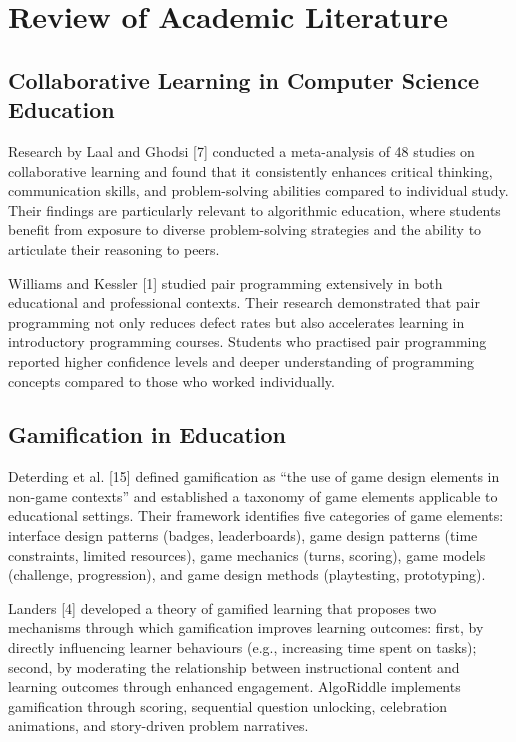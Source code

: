 \section{Review of Academic Literature}

\subsection{Collaborative Learning in Computer Science Education}

Research by Laal and Ghodsi [7] conducted a meta-analysis of 48 studies on collaborative learning and found that it consistently enhances critical thinking, communication skills, and problem-solving abilities compared to individual study. Their findings are particularly relevant to algorithmic education, where students benefit from exposure to diverse problem-solving strategies and the ability to articulate their reasoning to peers.

Williams and Kessler [1] studied pair programming extensively in both educational and professional contexts. Their research demonstrated that pair programming not only reduces defect rates but also accelerates learning in introductory programming courses. Students who practised pair programming reported higher confidence levels and deeper understanding of programming concepts compared to those who worked individually.

\subsection{Gamification in Education}

Deterding et al. [15] defined gamification as ``the use of game design elements in non-game contexts'' and established a taxonomy of game elements applicable to educational settings. Their framework identifies five categories of game elements: interface design patterns (badges, leaderboards), game design patterns (time constraints, limited resources), game mechanics (turns, scoring), game models (challenge, progression), and game design methods (playtesting, prototyping).

Landers [4] developed a theory of gamified learning that proposes two mechanisms through which gamification improves learning outcomes: first, by directly influencing learner behaviours (e.g., increasing time spent on tasks); second, by moderating the relationship between instructional content and learning outcomes through enhanced engagement. AlgoRiddle implements gamification through scoring, sequential question unlocking, celebration animations, and story-driven problem narratives.

